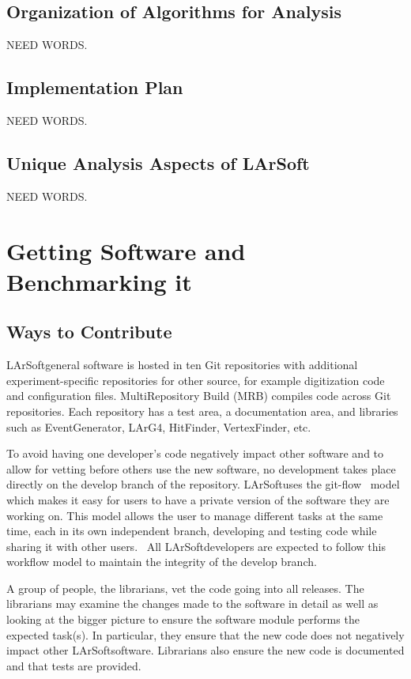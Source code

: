 \documentclass[12pt]{elsarticle}
\newcommand{\larsoft}{LArSoft}
\begin{document}
\subsection{Organization of Algorithms for Analysis}
NEED WORDS.

\subsection{Implementation Plan}
NEED WORDS.

\subsection{Unique Analysis Aspects of \larsoft}
NEED WORDS.

\section{Getting Software and Benchmarking it}
\subsection{Ways to Contribute}

\larsoft general software is hosted in ten Git repositories with additional experiment-specific repositories for other source, for example digitization code and configuration files. MultiRepository Build (MRB) compiles code across Git repositories. Each repository has a test area, a documentation area, and libraries such as EventGenerator, LArG4, HitFinder, VertexFinder, etc.~\cite{gian}

To avoid having one developer's code negatively impact other software and to allow for vetting before others use the new software, no development takes place directly on the develop branch of the repository. \larsoft uses the git-flow~\cite{git-flow} model which makes it easy for users to have a private version of the software they are working on. This model allows the user to manage different tasks at the same time, each in its own independent branch, developing and testing code while sharing it with other users.~\cite{git-control} All \larsoft developers are expected to follow this workflow model to maintain the integrity of the develop branch.

A group of people, the librarians, vet the code going into all releases. The librarians may examine the changes made to the software in detail as well as looking at the bigger picture to ensure the software module performs the expected task(s). In particular, they ensure that the new code does not negatively impact other \larsoft software. Librarians also ensure the new code is documented and that tests are provided.
\end{document}
